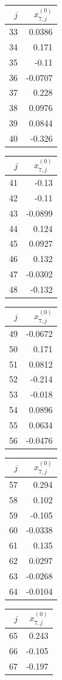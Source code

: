 {\begin{tabular}[t]{r|r}
$j$ & $x^{(0)}_{7,j}$ \\\hline
33 & 0.0386 \\
34 & 0.171 \\
35 & -0.11 \\
36 & -0.0707 \\
37 & 0.228 \\
38 & 0.0976 \\
39 & 0.0844 \\
40 & -0.326
\end{tabular}\kern4pt
\begin{tabular}[t]{r|r}
$j$ & $x^{(0)}_{7,j}$ \\\hline
41 & -0.13 \\
42 & -0.11 \\
43 & -0.0899 \\
44 & 0.124 \\
45 & 0.0927 \\
46 & 0.132 \\
47 & -0.0302 \\
48 & -0.132
\end{tabular}\kern4pt
\begin{tabular}[t]{r|r}
$j$ & $x^{(0)}_{7,j}$ \\\hline
49 & -0.0672 \\
50 & 0.171 \\
51 & 0.0812 \\
52 & -0.214 \\
53 & -0.018 \\
54 & 0.0896 \\
55 & 0.0634 \\
56 & -0.0476
\end{tabular}\kern4pt
\begin{tabular}[t]{r|r}
$j$ & $x^{(0)}_{7,j}$ \\\hline
57 & 0.294 \\
58 & 0.102 \\
59 & -0.105 \\
60 & -0.0338 \\
61 & 0.135 \\
62 & 0.0297 \\
63 & -0.0268 \\
64 & -0.0104
\end{tabular}\kern4pt
\begin{tabular}[t]{r|r}
$j$ & $x^{(0)}_{7,j}$ \\\hline
65 & 0.243 \\
66 & -0.105 \\
67 & -0.197 \\

\end{tabular}}
